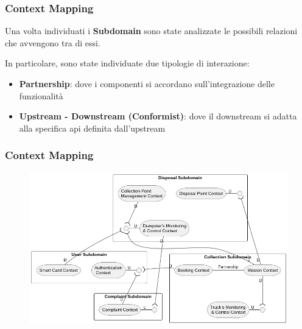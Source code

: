 \begin{frame}
    \frametitle{Context Mapping}
    Una volta individuati i \textbf{Subdomain} sono state analizzate le possibili relazioni che avvengono tra di essi.

    \bigskip

    In particolare, sono state individuate due tipologie di interazione:
    \begin{itemize}
        \item \textbf{Partnership}: dove i componenti si accordano sull'integrazione delle funzionalità
        \item \textbf{Upstream - Downstream (Conformist)}: dove il downstream si adatta alla specifica api definita dall'upstream
    \end{itemize}

\end{frame}

\begin{frame}
    \frametitle{Context Mapping}

    \begin{figure}[H]
        \centering
        \includegraphics[width=\linewidth]{../img/context-mapping}
    \end{figure}

\end{frame}
